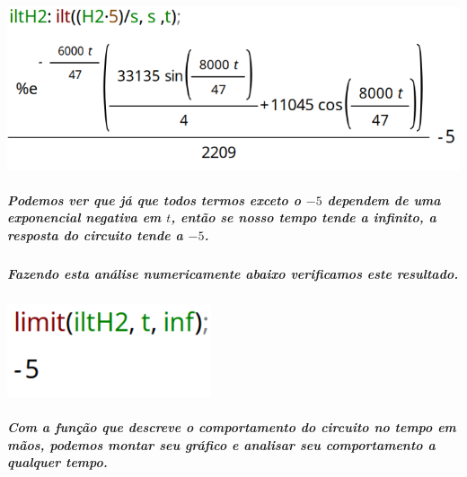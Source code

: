 \documentclass[12pt,twoside, a4paper, twocolumn]{article}
\begin{document}
\subparagraph*{}








\begin{adjustbox}{scale=0.35}
    \includegraphics{iltH2.png}
\end{adjustbox}








\subparagraph*{Podemos ver que já que todos termos exceto o $-5$ dependem de uma exponencial negativa em $t$, então se nosso tempo tende a infinito, a resposta do circuito tende a $-5$.}




\subparagraph*{Fazendo esta análise numericamente abaixo verificamos este resultado.}




\subparagraph*{}




\begin{adjustbox}{scale=0.4}
    \includegraphics{limH2.png}
\end{adjustbox}




\subparagraph*{Com a função que descreve o comportamento do circuito no tempo em mãos, podemos montar seu gráfico e analisar seu comportamento a qualquer tempo.}




\newpage
\end{document}
